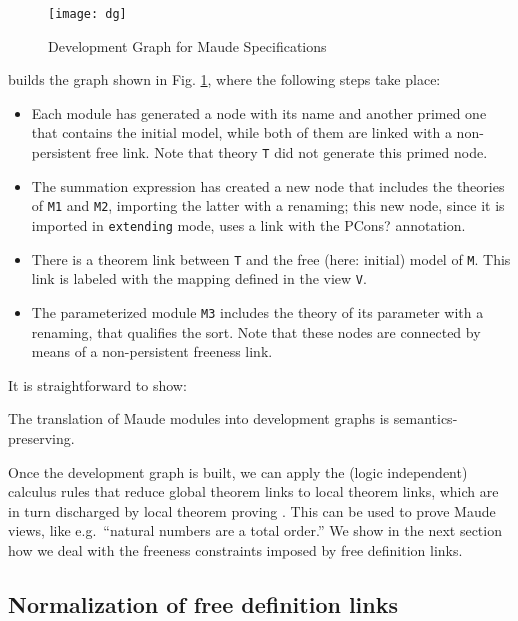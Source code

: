 \begin{figure}[t]
\begin{center}
\texttt{[image: dg]}
\caption{Development Graph for Maude Specifications\label{fig:dg}}
\end{center}
\end{figure}

\noindent \Hets builds the graph shown in Fig. \ref{fig:dg},
where the following steps take place:
\begin{itemize}
\item Each module has generated a node with its name and
another primed one that contains the initial model, while both of them
are linked with a non-persistent free link. Note that theory \verb"T" did not
generate this primed node.
\item The summation expression has created a new node that includes the theories
of \verb"M1" and \verb"M2", importing the latter with a renaming; this new
node, since it is imported in \verb"extending" mode, uses a link with the
\textsf{PCons?} annotation.
\item There is a theorem link between \verb"T" and the free (here: initial) model of
\verb"M". This link is labeled with the mapping defined in the view \verb"V".
\item The parameterized module \verb"M3" includes the theory of its parameter
with a renaming, that qualifies the sort. Note that these nodes are connected
by means of a non-persistent freeness link.
\end{itemize}

It is straightforward to show:
\begin{theorem}
The translation of Maude modules into development graphs is
semantics-preserving. %
\end{theorem}

Once the development graph is built, we can apply the (logic
independent) calculus rules that reduce global theorem links to local
theorem links, which are in turn discharged by local theorem proving
\cite{MAH-05-a}.  This can be used to prove Maude views, like e.g.\
``natural numbers are a total order.''  We show in the next
section how we deal with the freeness constraints imposed by free 
definition links.

\subsection{Normalization of free definition links}
\label{sec:free}

